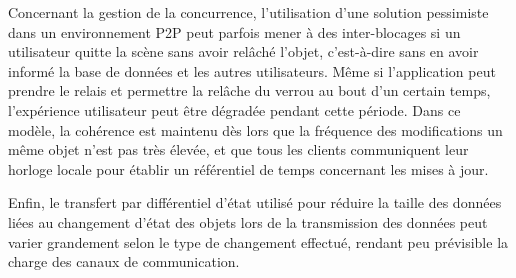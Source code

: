 Concernant la gestion de la concurrence, l'utilisation d'une solution pessimiste 
dans un environnement \gls{P2P} peut parfois mener à des inter-blocages si un 
utilisateur quitte la scène sans avoir relâché l'objet, c'est-à-dire sans en avoir 
informé la base de données et les autres 
utilisateurs. 
Même si l'application peut prendre le relais et permettre la relâche du 
verrou au bout d'un certain temps, l'expérience utilisateur peut être dégradée 
pendant cette période.
Dans ce modèle, la cohérence est maintenu dès lors que la fréquence des 
modifications un même objet n'est pas très élevée, et que tous les clients 
communiquent leur horloge locale pour établir un 
référentiel de temps concernant les mises à jour. 

Enfin, le transfert par différentiel d'état utilisé pour réduire la taille des 
données liées au changement d'état des objets lors de la transmission des 
données peut varier grandement selon le type de changement 
effectué, rendant peu prévisible la charge des canaux de communication. 
%
